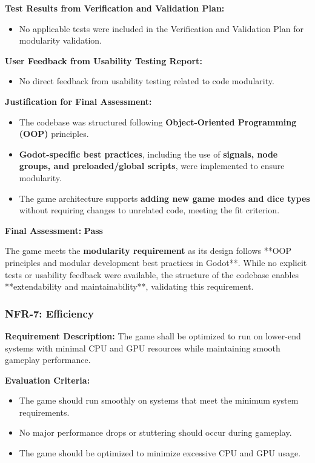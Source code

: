 \documentclass[12pt, titlepage]{article}
\begin{document}
\textbf{Test Results from Verification and Validation Plan:}  
\begin{itemize}
    \item No applicable tests were included in the Verification and Validation Plan for modularity validation.
\end{itemize}

\textbf{User Feedback from Usability Testing Report:}  
\begin{itemize}
    \item No direct feedback from usability testing related to code modularity.
\end{itemize}

\textbf{Justification for Final Assessment:}  
\begin{itemize}
    \item The codebase was structured following \textbf{Object-Oriented Programming (OOP)} principles.
    \item \textbf{Godot-specific best practices}, including the use of \textbf{signals, node groups, and preloaded/global scripts}, were implemented to ensure modularity.
    \item The game architecture supports \textbf{adding new game modes and dice types} without requiring changes to unrelated code, meeting the fit criterion.
\end{itemize}

\textbf{Final Assessment:} \textbf{Pass}  

The game meets the \textbf{modularity requirement} as its design follows **OOP principles and modular development best practices in Godot**. While no explicit tests or usability feedback were available, the structure of the codebase enables **extendability and maintainability**, validating this requirement.


\subsubsection{NFR-7: Efficiency}

\textbf{Requirement Description:}  
The game shall be optimized to run on lower-end systems with minimal CPU and GPU resources while maintaining smooth gameplay performance.

\textbf{Evaluation Criteria:}  
\begin{itemize}
    \item The game should run smoothly on systems that meet the minimum system requirements.
    \item No major performance drops or stuttering should occur during gameplay.
    \item The game should be optimized to minimize excessive CPU and GPU usage.
\end{itemize}
\end{document}
